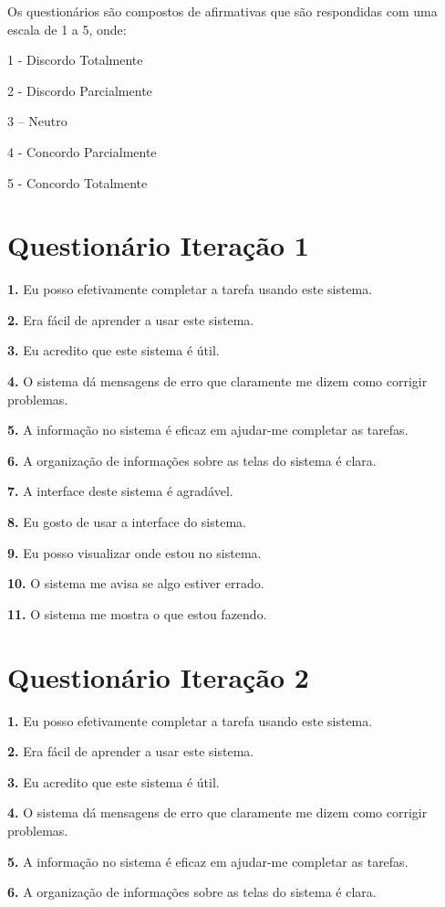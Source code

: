 Os questionários são compostos de afirmativas que são respondidas com uma escala de 1 a 5, onde:

1 - Discordo Totalmente

2 - Discordo Parcialmente

3 – Neutro 

4 - Concordo Parcialmente

5 - Concordo Totalmente
\section{Questionário Iteração 1}
\textbf{1.} Eu posso efetivamente completar a tarefa usando este sistema.

\textbf{2.} Era fácil de aprender a usar este sistema.

\textbf{3.} Eu acredito que este sistema é útil.

\textbf{4.} O sistema dá mensagens de erro que claramente me dizem como corrigir problemas.

\textbf{5.} A informação no sistema é eficaz em ajudar-me completar as tarefas.

\textbf{6.} A organização de informações sobre as telas do sistema é clara.

\textbf{7.} A interface deste sistema é agradável.

\textbf{8.} Eu gosto de usar a interface do sistema.

\textbf{9.} Eu posso visualizar onde estou no sistema.

\textbf{10.} O sistema me avisa se algo estiver errado.

\textbf{11.} O sistema me mostra o que estou fazendo.




\section{Questionário Iteração 2}

\textbf{1.} Eu posso efetivamente completar a tarefa usando este sistema.

\textbf{2.} Era fácil de aprender a usar este sistema.

\textbf{3.} Eu acredito que este sistema é útil.

\textbf{4.} O sistema dá mensagens de erro que claramente me dizem como corrigir problemas.

\textbf{5.} A informação no sistema é eficaz em ajudar-me completar as tarefas.

\textbf{6.} A organização de informações sobre as telas do sistema é clara.

